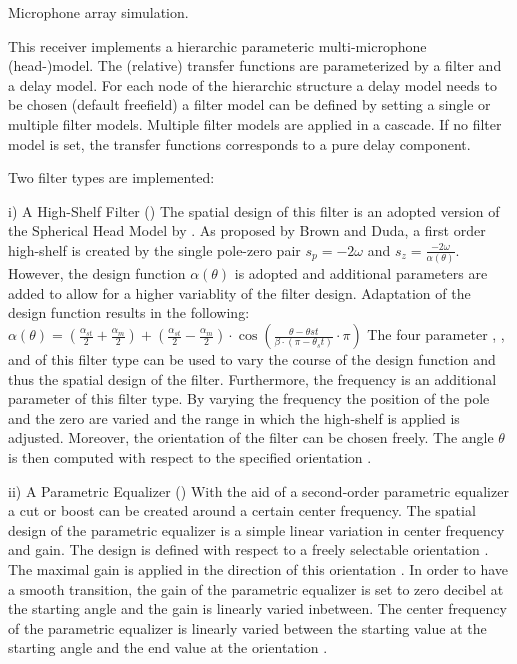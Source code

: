 Microphone array simulation.

This receiver implements a hierarchic parameteric multi-microphone (head-)model.
The (relative) transfer functions are parameterized by a filter and a delay model.
For each node of the hierarchic structure a delay model needs to be chosen (default
freefield) a filter model can be defined by setting a single or multiple filter
models. Multiple filter models are applied in a cascade. If no filter model is set,
the transfer functions corresponds to a pure delay component.

Two filter types are implemented:

i) A High-Shelf Filter ()
The spatial design of this filter is an adopted version of the Spherical Head Model by
\citet{BrownDuda}. As proposed by Brown and Duda, a first order high-shelf is created
by the single pole-zero pair $s_p=-2\omega$ and $s_z=\frac{-2\omega}{\alpha(\theta)}$. 
However, the design function $\alpha(\theta)$ is adopted and additional parameters are
added to allow for a higher variablity of the filter design.
Adaptation of the design function results in the following:
$\alpha(\theta) = \left(\frac{\alpha_{st}}{2} + \frac{\alpha_m}{2}\right) +
\left(\frac{\alpha_{st}}{2} - \frac{\alpha_m}{2}\right) \cdot
\cos\left(\frac{\theta - \theta{st}}{\beta\cdot(\pi - \theta_st)}\cdot\pi\right)$
The four parameter , ,  and
 of this filter type can be used to vary the course of the design function
and thus the spatial design of the filter.
Furthermore, the frequency  is an additional parameter of this filter
type. By varying the frequency  the position of the pole and the zero are
varied and the range in which the high-shelf is applied is adjusted.
Moreover, the orientation  of the filter can be chosen freely. The angle
$\theta$ is then computed with respect to the specified orientation .

ii) A Parametric Equalizer ()
With the aid of a second-order parametric equalizer a cut or boost can be created around
a certain center frequency. The spatial design of the parametric equalizer is a simple
linear variation in center frequency and gain. The design is defined with respect to a
freely selectable orientation .
The maximal gain is applied in the direction of this orientation . In order
to have a smooth transition, the gain of the parametric equalizer is set to zero decibel
at the starting angle  and the gain is linearly varied inbetween.
The center frequency of the parametric equalizer is linearly varied between the starting
value  at the starting angle  and the end value
 at the orientation .

